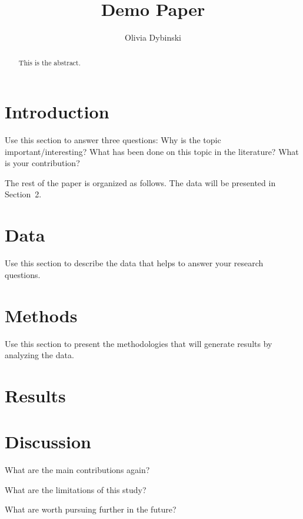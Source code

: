 \documentclass[12pt]{article}
\title{Demo Paper}
\author{Olivia Dybinski\\}
\begin{document}
 \maketitle

 \begin{abstract}
This is the abstract. 
 \end{abstract}


 \section{Introduction}
 \label{sec:intro}

 Use this section to answer three questions:
 Why is the topic important/interesting?
 What has been done on this topic in the literature?
 What is your contribution?


 The rest of the paper is organized as follows.
 The data will be presented in Section~2.


 \section{Data}
 \label{sec:data}

 Use this section to describe the data that helps to answer your research questions.

 \section{Methods}
 \label{sec:meth}

 Use this section to present the methodologies that will generate results by analyzing the data.

 \section{Results}
 \label{sec:results}


 \section{Discussion}
 \label{sec:disc}

 What are the main contributions again?

 What are the limitations of this study?

 What are worth pursuing further in the future?


 
\end{document}
